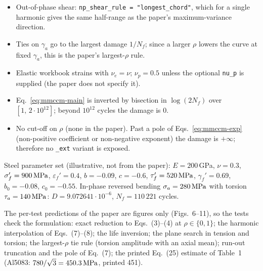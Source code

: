 \begin{itemize}
\item Out-of-phase shear: \texttt{np\_shear\_rule = "longest\_chord"}, which for a single harmonic
  gives the same half-range as the paper's maximum-variance direction.
\item Ties on $\gamma_a$ go to the largest damage $1/N_f$; since a larger $\rho$ lowers the curve at
  fixed $\gamma_a$, this is the paper's largest-$\rho$ rule.
\item Elastic workbook strains with $\nu_e=\nu$; $\nu_p=0.5$ unless the optional \texttt{nu\_p} is
  supplied (the paper does not specify it).
\item Eq.~\eqref{eq:mmccm-main} is inverted by bisection in $\log(2N_f)$ over $[1,\,2\cdot10^{12}]$;
  beyond $10^{12}$ cycles the damage is 0.
\item No cut-off on $\rho$ (none in the paper). Past a pole of Eqs.~\eqref{eq:mmccm-exp}
  (non-positive coefficient or non-negative exponent) the damage is $+\infty$; therefore no
  \texttt{\_ext} variant is exposed.
\end{itemize}

 Steel parameter set (illustrative, not from the paper): $E=200$\,GPa,
$\nu=0.3$, $\sigma_f'=900\,\mathrm{MPa}$, $\varepsilon_f'=0.4$, $b=-0.09$, $c=-0.6$, $\tau_f'=520\,\mathrm{MPa}$,
$\gamma_f'=0.69$, $b_0=-0.08$, $c_0=-0.55$. In-phase reversed bending $\sigma_a=280\,\mathrm{MPa}$ with
torsion $\tau_a=140\,\mathrm{MPa}$: $D=9.072641\cdot10^{-6}$, $N_f=110\,221$ cycles.

 The per-test predictions of the paper are figures only (Figs.~6--11), so the
tests check the formulation: exact reduction to Eqs.~(3)--(4) at $\rho\in\{0,1\}$; the harmonic
interpolation of Eqs.~(7)--(8); the life inversion; the plane search in tension and torsion; the
largest-$\rho$ tie rule (torsion amplitude with an axial mean); run-out truncation and the pole of
Eq.~(7); the printed Eq.~(25) estimate of Table~1 (Al5083: $780/\sqrt3=450.3\,\mathrm{MPa}$, printed 451).
